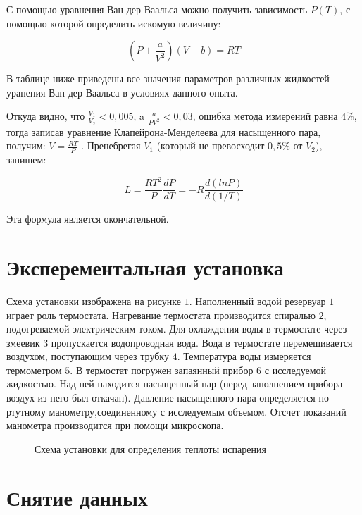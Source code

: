 С помощью уравнения Ван-дер-Ваальса можно получить зависимость $P(T)$, с помощью которой определить искомую величину:

\begin{equation}
	\left(P+\frac{a}{V^2}\right)(V-b) = RT
\end{equation}

В таблице ниже приведены все значения параметров различных жидкостей уранения Ван-дер-Ваальса в условиях данного опыта.

\begin{figure}[h]
\end{figure}

Откуда видно, что $\frac{V_1}{V_2} < 0,005$, a $\frac{a}{PV^2}<0,03$, ошибка метода измерений равна $4\%$, тогда записав уравнение Клапейрона-Менделеева для насыщенного пара, получим:
$V=\frac{RT}{P}\;.$
Пренебрегая $V_1$ (который не превосходит $0,5\%$ от $V_2$), запишем:

\begin{equation}
	L=\frac{RT^2}{P} \frac{dP}{dT} = -R\frac{d(lnP)}{d(1/T)}
\end{equation}

Эта формула является окончательной.

\section{Эксперементальная установка}

Схема установки изображена на рисунке $1$. Наполненный водой резервуар $1$ играет роль термостата. Нагревание термостата производится спиралью $2$, подогреваемой электрическим током. Для охлаждения воды в термостате через змеевик $3$ пропускается водопроводная вода. Вода в термостате перемешивается воздухом,
поступающим через трубку $4$. Температура воды измеряется термометром $5$. В термостат погружен запаянный прибор $6$ с исследуемой жидкостью. Над ней находится насыщенный пар (перед заполнением прибора воздух из него был откачан).
Давление насыщенного пара определяется по ртутному манометру,соединенному с исследуемым объемом. Отсчет показаний манометра производится при помощи микроскопа.

\begin{figure}[h]
	\caption{Схема установки для определения теплоты испарения}
\end{figure}

\section{Снятие данных}

